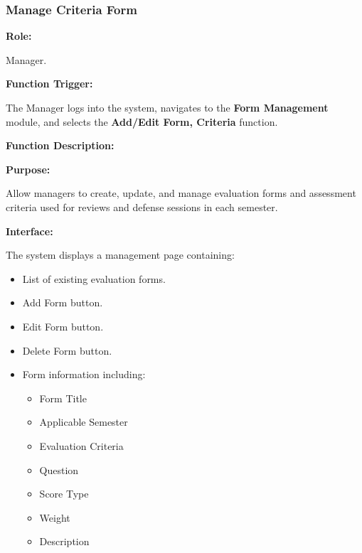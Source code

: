 \subsubsection{Manage Criteria Form}

\textbf{Role:}

Manager.

\vspace{0.3cm}

\textbf{Function Trigger:}

The Manager logs into the system, navigates to the \textbf{Form Management} module, and selects the \textbf{Add/Edit Form, Criteria} function.

\vspace{0.3cm}

\textbf{Function Description:}

\textbf{Purpose:}

Allow managers to create, update, and manage evaluation forms and assessment criteria used for reviews and defense sessions in each semester.

\vspace{0.2cm}

\textbf{Interface:}

The system displays a management page containing:

\begin{itemize}
    \item List of existing evaluation forms.
    \item Add Form button.
    \item Edit Form button.
    \item Delete Form button.
    \item Form information including:
    \begin{itemize}
        \item Form Title
        \item Applicable Semester
        \item Evaluation Criteria
        \item Question
        \item Score Type
        \item Weight
        \item Description
    \end{itemize}
\end{itemize}

\vspace{0.2cm}

